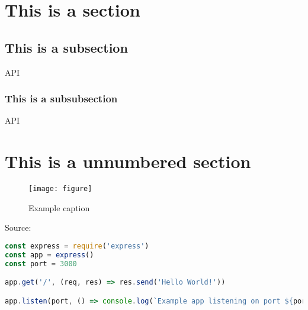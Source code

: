 
\section{This is a section}
\blindtext {}
\subsection{This is a subsection}
\blindtext \ac{API}
\subsubsection{This is a subsubsection}
\blindtext \ac{API}
\section*{This is a unnumbered section}
\begin{figure}[ht] 
    \centering
    \caption{Example caption}
    \texttt{[image: figure]} 
    \label{fig:goodreference}
    \end{figure}
\blindtext

\begin{subcaptionenv}{Source: }
    \begin{lstlisting}[caption={Express Example}, language=javascript]
const express = require('express')
const app = express()
const port = 3000

app.get('/', (req, res) => res.send('Hello World!'))

app.listen(port, () => console.log(`Example app listening on port ${port}!`))
    \end{lstlisting}
\end{subcaptionenv}